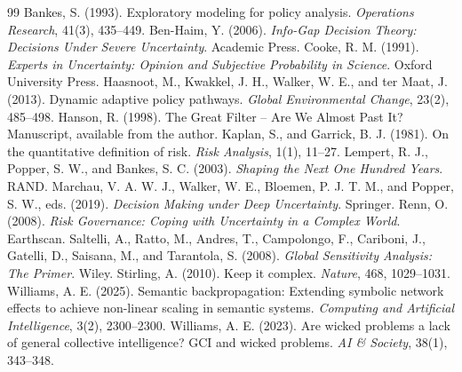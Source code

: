 \documentclass[11pt]{article}
\begin{document}
\begin{thebibliography}{99}
 Bankes, S. (1993). Exploratory modeling for policy analysis. \textit{Operations Research}, 41(3), 435--449.
 Ben-Haim, Y. (2006). \textit{Info-Gap Decision Theory: Decisions Under Severe Uncertainty}. Academic Press.
 Cooke, R. M. (1991). \textit{Experts in Uncertainty: Opinion and Subjective Probability in Science}. Oxford University Press.
 Haasnoot, M., Kwakkel, J. H., Walker, W. E., and ter Maat, J. (2013). Dynamic adaptive policy pathways. \textit{Global Environmental Change}, 23(2), 485--498.
 Hanson, R. (1998). The Great Filter -- Are We Almost Past It? Manuscript, available from the author.
 Kaplan, S., and Garrick, B. J. (1981). On the quantitative definition of risk. \textit{Risk Analysis}, 1(1), 11--27.
 Lempert, R. J., Popper, S. W., and Bankes, S. C. (2003). \textit{Shaping the Next One Hundred Years}. RAND.
 Marchau, V. A. W. J., Walker, W. E., Bloemen, P. J. T. M., and Popper, S. W., eds. (2019). \textit{Decision Making under Deep Uncertainty}. Springer.
 Renn, O. (2008). \textit{Risk Governance: Coping with Uncertainty in a Complex World}. Earthscan.
 Saltelli, A., Ratto, M., Andres, T., Campolongo, F., Cariboni, J., Gatelli, D., Saisana, M., and Tarantola, S. (2008). \textit{Global Sensitivity Analysis: The Primer}. Wiley.
 Stirling, A. (2010). Keep it complex. \textit{Nature}, 468, 1029--1031.
 Williams, A. E. (2025). Semantic backpropagation: Extending symbolic network effects to achieve non-linear scaling in semantic systems. \textit{Computing and Artificial Intelligence}, 3(2), 2300--2300.
 Williams, A. E. (2023). Are wicked problems a lack of general collective intelligence? GCI and wicked problems. \textit{AI \& Society}, 38(1), 343--348.
\end{thebibliography}
\end{document}
